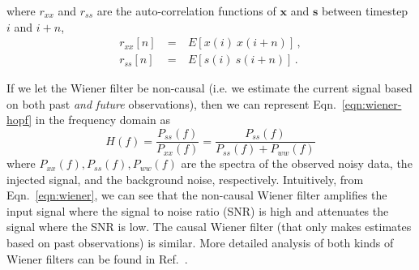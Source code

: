 \documentclass[paper-main.tex]{subfiles}
\begin{document}
where $r_{xx}$ and $r_{ss}$ are the auto-correlation functions of $\mathbf{x}$ and $\mathbf{s}$ between timestep $i$ and $i+n$, 
\begin{eqnarray} 
r_{xx}[n] &~=~& E[x(i)~x(i+n)] \,,\\
r_{ss}[n] &~=~& E[s(i)~s(i+n)] \,.
\end{eqnarray} 


If we let the Wiener filter be non-causal (i.e. we estimate the current signal based on both past \emph{and future} observations), then we can represent Eqn.~\ref{eqn:wiener-hopf} in the frequency domain as
\begin{equation}
\label{eqn:wiener}
    H(f)=\frac{P_{ss}(f)}{P_{xx}(f)}=\frac{P_{ss}(f)}{P_{ss}(f)+P_{ww}(f)}
\end{equation}
where $P_{xx}(f), P_{ss}(f), P_{ww}(f)$ are the spectra of the observed noisy data, the injected signal, and the background noise, respectively. Intuitively, from Eqn.~\ref{eqn:wiener}, we can see that the non-causal Wiener filter amplifies the input signal where the signal to noise ratio (SNR) is high and attenuates the signal where the SNR is low. The causal Wiener filter (that only makes estimates based on past observations) is similar. More detailed analysis of both kinds of Wiener filters can be found in Ref.~\citep{10.5555/151045}.

\end{document}
